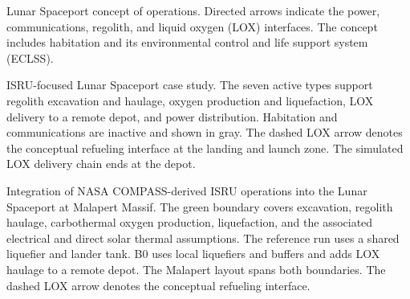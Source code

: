 \caption{Lunar Spaceport concept of operations. Directed arrows indicate the power, communications, regolith, and liquid oxygen (LOX) interfaces. The concept includes habitation and its environmental control and life support system (ECLSS).}
\label{fig:lunar-spaceport-concept}

\caption{ISRU-focused Lunar Spaceport case study. The seven active types support regolith excavation and haulage, oxygen production and liquefaction, LOX delivery to a remote depot, and power distribution. Habitation and communications are inactive and shown in gray. The dashed LOX arrow denotes the conceptual refueling interface at the landing and launch zone. The simulated LOX delivery chain ends at the depot.}
\label{fig:lunar-spaceport-isru}

\caption{Integration of NASA COMPASS-derived ISRU operations into the Lunar Spaceport at Malapert Massif. The green boundary covers excavation, regolith haulage, carbothermal oxygen production, liquefaction, and the associated electrical and direct solar thermal assumptions. The reference run uses a shared liquefier and lander tank. B0 uses local liquefiers and buffers and adds LOX haulage to a remote depot. The Malapert layout spans both boundaries. The dashed LOX arrow denotes the conceptual refueling interface.}
\label{fig:lunar-spaceport-compass}
